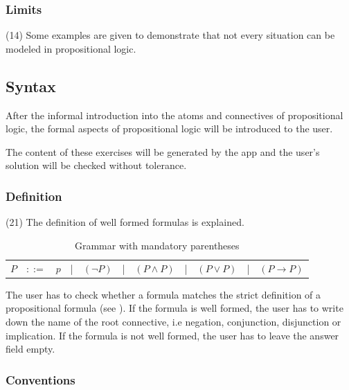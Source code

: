 \subsubsection{Limits}
\label{tut:14}

(14) Some examples are given to demonstrate that not every situation can be modeled in propositional logic.


\subsection{Syntax}

After the informal introduction into the atoms and connectives of propositional logic, 
the formal aspects of propositional logic will be introduced to the user.

The content of these exercises will be generated by the app and the user's solution will be checked without tolerance.

\subsubsection{Definition}
\label{tut:21}

(21) The definition of well formed formulas is explained. 

\begin{table}[htdp]
\begin{center}
\begin{tabular}{rcccccccccc}
$P$	&$::=$	&$p$ 	
	&|		& $(\neg P)$ 
	&|		&  $(P \wedge P)$ 
	&|		&  $(P \vee P)$ 
	&|		&  $(P \rightarrow P)$ \\
\end{tabular}
\caption{Grammar with mandatory parentheses}
\label{tab:BNFGRPA}
\end{center}
\end{table}

The user has to check whether a formula matches the strict definition of 
a propositional formula (see ).
If the formula is well formed, the user has to write down the name of the root connective, i.e
negation, conjunction, disjunction or implication. 
If the formula is not well formed, the user has to leave the answer field empty.

\subsubsection{Conventions}
\label{tut:22}

